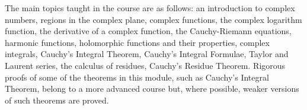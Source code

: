 
The main topics taught in the course are as follows: an introduction to complex numbers, regions in the complex plane, complex functions, the complex logarithm function, the derivative of a complex function, the Cauchy-Riemann equations, harmonic functions, holomorphic functions and their properties, complex integrals, Cauchy's Integral Theorem, Cauchy's Integral Formulae, Taylor and Laurent series, the calculus of residues, Cauchy's Residue Theorem. Rigorous proofs of some of the theorems in this module, such as Cauchy's Integral Theorem, belong to a more advanced course but, where possible, weaker versions of such theorems are proved.

